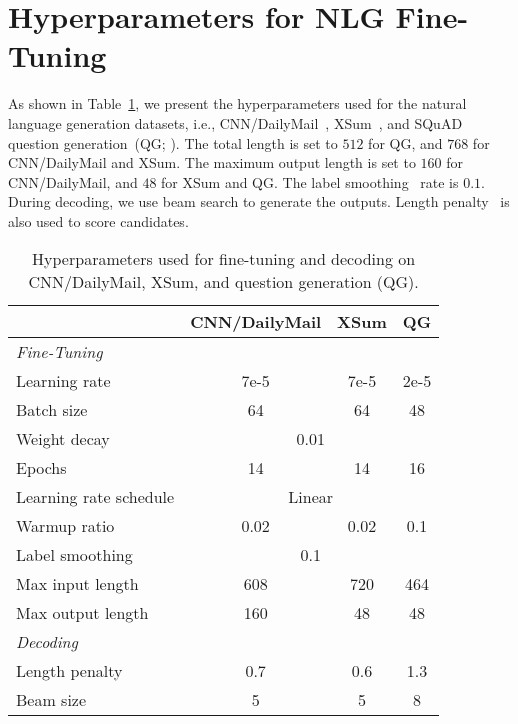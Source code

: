 \documentclass{article}
\begin{document}
\section{Hyperparameters for NLG Fine-Tuning}

As shown in Table~\ref{tbl:nlg_finetune_hyperparams}, we present the hyperparameters used for the natural language generation datasets, i.e., CNN/DailyMail~\cite{see-2017-get}, XSum~\cite{xsum}, and SQuAD question generation~(QG; \citealt{du-qg-2018,zhao-qg-2018}).
The total length is set to $512$ for QG, and $768$ for CNN/DailyMail and XSum.
The maximum output length is set to $160$ for CNN/DailyMail, and $48$ for XSum and QG.
The label smoothing~\cite{label:smoothing} rate is $0.1$.
During decoding, we use beam search to generate the outputs.
Length penalty~\cite{gnmt} is also used to score candidates.


\begin{table}[h]
\centering
\small
\begin{tabular}{lccc}
\toprule
 & \bf CNN/DailyMail & \bf XSum & \bf QG \\
\midrule
\multicolumn{4}{l}{\emph{Fine-Tuning}} \\
Learning rate & 7e-5 & 7e-5 & 2e-5 \\
Batch size & 64 & 64 & 48 \\
Weight decay & \multicolumn{3}{c}{0.01} \\
Epochs & 14 & 14 & 16 \\
Learning rate schedule & \multicolumn{3}{c}{Linear} \\
Warmup ratio & 0.02 & 0.02 & 0.1 \\
Label smoothing & \multicolumn{3}{c}{0.1} \\
Max input length & 608 & 720 & 464 \\
Max output length & 160 & 48 & 48 \\
\midrule
\multicolumn{4}{l}{\emph{Decoding}} \\
Length penalty & 0.7 & 0.6 & 1.3 \\
Beam size & 5 & 5 & 8 \\
\bottomrule
\end{tabular}
\caption{
Hyperparameters used for fine-tuning and decoding on CNN/DailyMail, XSum, and question generation (QG).
}
\label{tbl:nlg_finetune_hyperparams}
\end{table}
\end{document}
